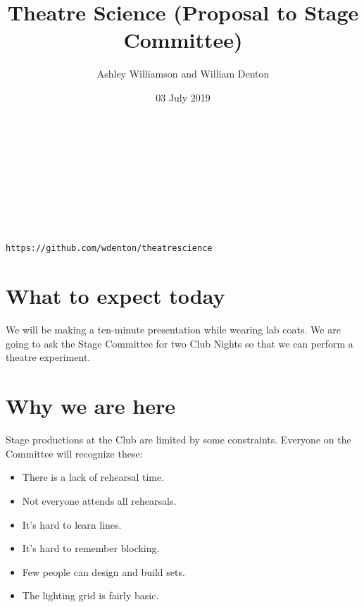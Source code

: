 \documentclass[11pt]{article}
\title{Theatre Science (Proposal to Stage Committee)}
\author{Ashley Williamson and William Denton}
\date{03 July 2019}
\begin{document}
\begin{center}


  \vspace{2cm}

  \\
  \vspace{0.5cm}
  \\

  \vspace{3cm}

  \\
  \vspace{0.2cm}
  \\

\vspace{5cm}

\\

\vfill

\ccby

\texttt{https://github.com/wdenton/theatrescience}

\end{center}

\clearpage

\section{What to expect today}

We will be making a ten-minute presentation while wearing lab coats.  We are going to ask the Stage Committee for two Club Nights so that we can perform a theatre experiment.


\section{Why we are here}

Stage productions at the Club are limited by some constraints.  Everyone on the Committee will recognize these:

\begin{itemize}

  \item There is a lack of rehearsal time.
  \item Not everyone attends all rehearsals.
  \item It's hard to learn lines.
  \item It's hard to remember blocking.
  \item Few people can design and build sets.
  \item The lighting grid is fairly basic.

\end{itemize}
\end{document}
